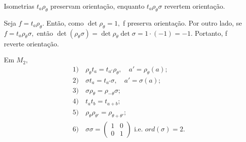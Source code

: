 \documentclass[Algebra/algebra_notes.tex]{subfiles}
\begin{document}
\begin{crl*}
	Isometrias $t_{a}\rho_{\theta }$ preservam orientação, enquanto $t_{a}\rho_{\theta }\sigma $ revertem orientação.
\end{crl*}
\begin{proof*}
	Seja $f=t_{a}\rho_{\theta }.$ Então, como $\det{\rho_{\theta }} =1,$ f preserva orientação. Por outro lado, se $f=t_{a}\rho_{\theta }\sigma ,$
	então $\det{(\rho_{\theta }\sigma )} = \det{\rho_{\theta }}\det{\sigma } = 1 \cdot (-1) = -1.$ Portanto, f reverte orientação. \qedsymbol
\end{proof*}
\begin{crl*}
	Em $M_{2},$
	\begin{align*}
		 & 1)\quad \rho_{\theta }t_{a} = t_{a'}\rho_{\theta },\quad a'=\rho_{\theta }(a); \\
		 & 2)\quad \sigma t_{a} = t_{a'}\sigma , \quad a'= \sigma(a);                     \\
		 & 3)\quad \sigma \rho_{\theta } = \rho_{-\theta }\sigma;                         \\
		 & 4)\quad t_{a}t_{b} = t_{a+b};                                                  \\
		 & 5)\quad \rho_{\theta }\rho_{\theta '} = \rho_{\theta +\theta '};               \\
		 & 6)\quad \sigma \sigma = \begin{pmatrix}
			                           1 & 0 \\
			                           0 & 1
		                           \end{pmatrix}\text{ i.e. } ord(\sigma ) = 2.
	\end{align*}
\end{crl*}
\end{document}
